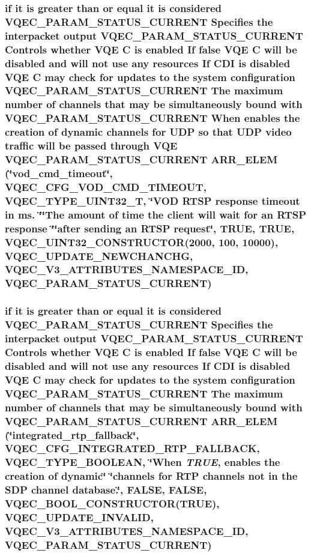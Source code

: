 \subsubsection{\setlength{\rightskip}{0pt plus 5cm}if it is greater than or equal it is considered VQEC\_\-PARAM\_\-STATUS\_\-CURRENT Specifies the interpacket output VQEC\_\-PARAM\_\-STATUS\_\-CURRENT Controls whether VQE \bf{C} is enabled If false VQE \bf{C} will be disabled and will not use any resources If CDI is disabled VQE \bf{C} may check for updates \bf{to} the system configuration VQEC\_\-PARAM\_\-STATUS\_\-CURRENT The maximum number of \bf{channels} that may be simultaneously bound with VQEC\_\-PARAM\_\-STATUS\_\-CURRENT When enables the creation of dynamic \bf{channels} for UDP so that UDP video traffic will be passed through VQE VQEC\_\-PARAM\_\-STATUS\_\-CURRENT ARR\_\-ELEM (\char`\"{}vod\_\-cmd\_\-timeout\char`\"{}, VQEC\_\-CFG\_\-VOD\_\-CMD\_\-TIMEOUT, \bf{VQEC\_\-TYPE\_\-UINT32\_\-T}, \char`\"{}VOD RTSP response timeout in ms. \char`\"{}\char`\"{}The amount of time the client will wait for an RTSP response \char`\"{}\char`\"{}after sending an RTSP request\char`\"{}, \bf{TRUE}, \bf{TRUE}, VQEC\_\-UINT32\_\-CONSTRUCTOR(2000, 100, 10000), \bf{VQEC\_\-UPDATE\_\-NEWCHANCHG}, \bf{VQEC\_\-V3\_\-ATTRIBUTES\_\-NAMESPACE\_\-ID}, VQEC\_\-PARAM\_\-STATUS\_\-CURRENT)}\label{vqec__cfg__settings_8h_04ee6c9961f5ab588f16dd5115a7608e}


\subsubsection{\setlength{\rightskip}{0pt plus 5cm}if it is greater than or equal it is considered VQEC\_\-PARAM\_\-STATUS\_\-CURRENT Specifies the interpacket output VQEC\_\-PARAM\_\-STATUS\_\-CURRENT Controls whether VQE \bf{C} is enabled If false VQE \bf{C} will be disabled and will not use any resources If CDI is disabled VQE \bf{C} may check for updates \bf{to} the system configuration VQEC\_\-PARAM\_\-STATUS\_\-CURRENT The maximum number of \bf{channels} that may be simultaneously bound with VQEC\_\-PARAM\_\-STATUS\_\-CURRENT ARR\_\-ELEM (\char`\"{}integrated\_\-rtp\_\-fallback\char`\"{}, VQEC\_\-CFG\_\-INTEGRATED\_\-RTP\_\-FALLBACK, \bf{VQEC\_\-TYPE\_\-BOOLEAN}, \char`\"{}When  {\em TRUE}, enables the creation of dynamic\char`\"{} \char`\"{}\bf{channels} for RTP \bf{channels} not in the SDP channel database.\char`\"{}, \bf{FALSE}, \bf{FALSE}, VQEC\_\-BOOL\_\-CONSTRUCTOR(\bf{TRUE}), \bf{VQEC\_\-UPDATE\_\-INVALID}, \bf{VQEC\_\-V3\_\-ATTRIBUTES\_\-NAMESPACE\_\-ID}, VQEC\_\-PARAM\_\-STATUS\_\-CURRENT)}\label{vqec__cfg__settings_8h_99c948cac81d9ba0f5c5c73c227d24b4}


